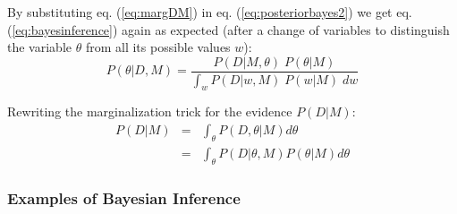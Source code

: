 By substituting eq. (\ref{eq:margDM}) in eq. (\ref{eq:posteriorbayes2}) we get eq. (\ref{eq:bayesinference}) again as expected (after a change of variables to distinguish the variable $\theta$ from all its possible values $w$):
\begin{equation}
P(\theta|D,M) = 
 \frac{P(D|M,\theta) \; P(\theta|M)}
       {\int_w P(D|w,M) \; P(w|M) \; dw}
\end{equation}

Rewriting the marginalization trick for the evidence $P(D|M)$:
\begin{eqnarray}
P(D|M) & = & \int_{\theta} P(D,\theta|M) d \theta \\
       & = & \int_{\theta} P(D|\theta,M) P(\theta|M) d \theta
\end{eqnarray}

\subsubsection{Examples of Bayesian Inference}

